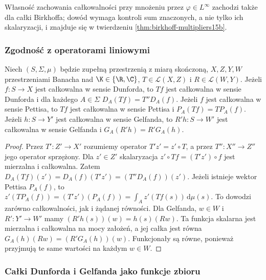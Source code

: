 Własność zachowania całkowalności przy mnożeniu
przez $\varphi\in L^\infty$ zachodzi także dla
całki Birkhoffa; dowód wymaga kontroli sum znaczonych,
a nie tylko ich skalaryzacji, i znajduje się
w twierdzeniu \ref{thm:birkhoff-multipliers15b}.

\subsubsection{Zgodność z operatorami liniowymi}

\begin{stwierdzenie}
\label{prop:vector-integrals-operators15b}
Niech $(S,\Sigma,\mu)$ będzie zupełną przestrzenią z miarą
skończoną, $X,Z,Y,W$ przestrzeniami Banacha nad
$\K\in\{\R,\C\}$, $T\in\mathcal L(X,Z)$ i
$R\in\mathcal L(W,Y)$. Jeżeli $f:S\to X$ jest
całkowalna w sensie Dunforda, to $Tf$ jest całkowalna
w sensie Dunforda i dla każdego $A\in\Sigma$
$D_A(Tf)=T''D_A(f)$.
Jeżeli $f$ jest całkowalna w sensie Pettisa, to $Tf$
jest całkowalna w sensie Pettisa i
$P_A(Tf)=T P_A(f)$.
Jeżeli $h:S\to Y'$ jest całkowalna w sensie Gelfanda,
to $R'h:S\to W'$ jest całkowalna w sensie Gelfanda i
$G_A(R'h)=R'G_A(h)$.
\end{stwierdzenie}
\begin{proof}
Przez $T':Z'\to X'$ rozumiemy operator
$T'z'=z'\circ T$, a przez $T'':X''\to Z''$ jego
operator sprzężony. Dla $z'\in Z'$ skalaryzacja
$z'\circ Tf=(T'z')\circ f$ jest mierzalna i całkowalna.
Zatem
$D_A(Tf)(z')=D_A(f)(T'z')=(T''D_A(f))(z')$.
Jeżeli istnieje wektor Pettisa $P_A(f)$, to
$z'(TP_A(f))=(T'z')(P_A(f))
=\int_Az'(Tf(s))\,\mathrm d\mu(s)$.
To dowodzi zarówno całkowalności, jak i żądanej równości.
Dla Gelfanda, $w\in W$ i $R':Y'\to W'$ mamy
$(R'h(s))(w)=h(s)(Rw)$. Ta funkcja skalarna jest
mierzalna i całkowalna na mocy założeń, a jej całka
jest równa $G_A(h)(Rw)=(R'G_A(h))(w)$.
Funkcjonały są równe, ponieważ przyjmują te same wartości
na każdym $w\in W$.
\end{proof}

\subsubsection{Całki Dunforda i Gelfanda jako funkcje zbioru}


